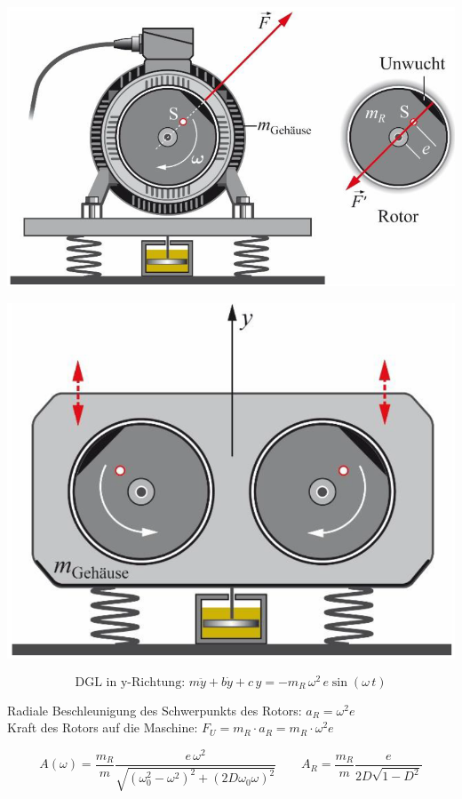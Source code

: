 \begin{minipage}{0.52\linewidth}
\includegraphics[width=0.9\linewidth]{Bilder/Wellen-Optik/unwucht} \\
\end{minipage}
\hfill
\begin{minipage}{0.44\linewidth}
\includegraphics[width=0.89\linewidth]{Bilder/Wellen-Optik/unwucht_gehause} \\
\end{minipage}

$$ \boxed{ \text{DGL in y-Richtung: } m \ddot{y} + b \dot{y} + c \, y = -m_R \, \omega^2 \, e \sin(\omega \, t) }  $$

Radiale Beschleunigung des Schwerpunkts des Rotors: $a_R = \omega^2 e$ \\

Kraft des Rotors auf die Maschine: $\boxed{ F_U = m_R \cdot a_R = m_R \cdot \omega^2 e } $ 

$$ A(\omega) = \frac{m_R}{m} \frac{e \, \omega^2}{\sqrt{(\omega_0^2 -\omega^2)^2 + (2D \omega_0 \omega)^2}}  \qquad A_R = \frac{m_R}{m} \frac{e}{2D \sqrt{1 - D^2}}  $$


